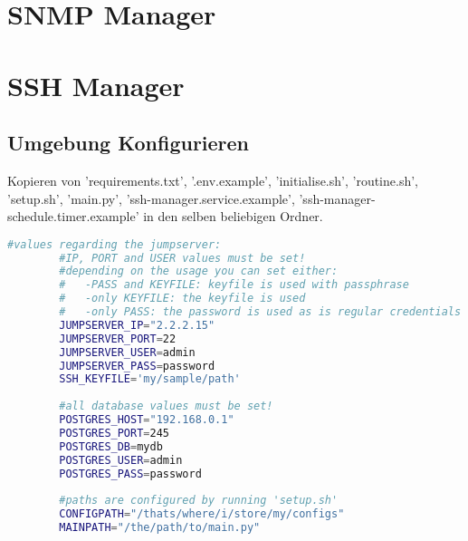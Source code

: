 \documentclass{article}
\begin{document}
	\newpage
	
	\section{SNMP Manager}
	\newpage
	
	\section{SSH Manager}
	\subsection[file config]{Umgebung Konfigurieren}
	
	Kopieren von 'requirements.txt', '.env.example', 'initialise.sh', 'routine.sh', 'setup.sh', 'main.py', 'ssh-manager.service.example', 'ssh-manager-schedule.timer.example' in den selben beliebigen Ordner. 
	
	\lstset{style=files}
	\begin{lstlisting}[caption={Anhand von '.env.example' eigene '.env' Datei anlegen}, language=bash]
		#values regarding the jumpserver:
		#IP, PORT and USER values must be set!
		#depending on the usage you can set either:
		#   -PASS and KEYFILE: keyfile is used with passphrase
		#   -only KEYFILE: the keyfile is used
		#   -only PASS: the password is used as is regular credentials
		JUMPSERVER_IP="2.2.2.15"
		JUMPSERVER_PORT=22
		JUMPSERVER_USER=admin
		JUMPSERVER_PASS=password
		SSH_KEYFILE='my/sample/path'
		
		#all database values must be set!
		POSTGRES_HOST="192.168.0.1"
		POSTGRES_PORT=245
		POSTGRES_DB=mydb
		POSTGRES_USER=admin
		POSTGRES_PASS=password
		
		#paths are configured by running 'setup.sh'
		CONFIGPATH="/thats/where/i/store/my/configs"
		MAINPATH="/the/path/to/main.py"
	\end{lstlisting}
	
	\newpage
\end{document}
